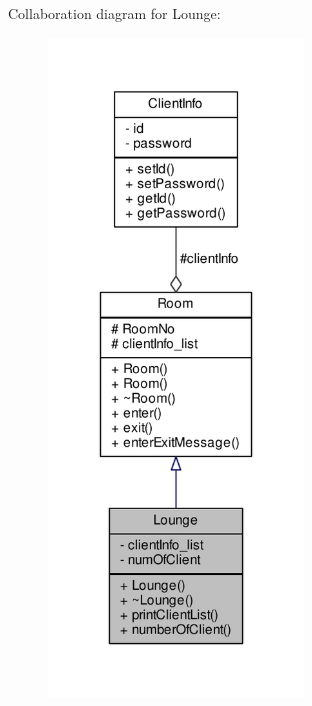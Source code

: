 Collaboration diagram for Lounge\+:
\nopagebreak
\begin{figure}[H]
\begin{center}
\leavevmode
\includegraphics[width=192pt]{class_lounge__coll__graph}
\end{center}
\end{figure}
